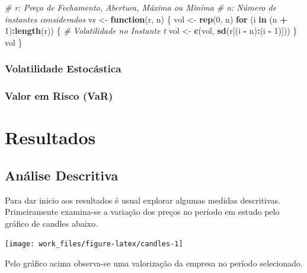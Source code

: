 \documentclass[]{article}
\newenvironment{Shaded}{\begin{snugshade}}{\end{snugshade}}
\newcommand{\KeywordTok}[1]{\textcolor[rgb]{0.13,0.29,0.53}{\textbf{#1}}}
\newcommand{\DecValTok}[1]{\textcolor[rgb]{0.00,0.00,0.81}{#1}}
\newcommand{\StringTok}[1]{\textcolor[rgb]{0.31,0.60,0.02}{#1}}
\newcommand{\CommentTok}[1]{\textcolor[rgb]{0.56,0.35,0.01}{\textit{#1}}}
\newcommand{\ControlFlowTok}[1]{\textcolor[rgb]{0.13,0.29,0.53}{\textbf{#1}}}
\newcommand{\OperatorTok}[1]{\textcolor[rgb]{0.81,0.36,0.00}{\textbf{#1}}}
\newcommand{\NormalTok}[1]{#1}
\begin{document}
\begin{Shaded}
\begin{Highlighting}[]
\CommentTok{# r: Preço de Fechamento, Abertura, Máxima ou Miníma}
\CommentTok{# n: Número de instantes considerados}
\NormalTok{vs <-}\StringTok{ }\ControlFlowTok{function}\NormalTok{(r, n) \{}
\NormalTok{    vol <-}\StringTok{ }\KeywordTok{rep}\NormalTok{(}\DecValTok{0}\NormalTok{, n)}
    \ControlFlowTok{for}\NormalTok{ (i }\ControlFlowTok{in}\NormalTok{ (n }\OperatorTok{+}\StringTok{ }\DecValTok{1}\NormalTok{)}\OperatorTok{:}\KeywordTok{length}\NormalTok{(r)) \{}
        \CommentTok{# Volatilidade no Instante t}
\NormalTok{        vol <-}\StringTok{ }\KeywordTok{c}\NormalTok{(vol, }\KeywordTok{sd}\NormalTok{(r[(i }\OperatorTok{-}\StringTok{ }\NormalTok{n)}\OperatorTok{:}\NormalTok{(i }\OperatorTok{-}\StringTok{ }\DecValTok{1}\NormalTok{)]))}
\NormalTok{    \}}
\NormalTok{    vol}
\NormalTok{\}}
\end{Highlighting}
\end{Shaded}

\subsubsection{Volatilidade Estocástica}\label{volatilidade-estocastica}

\subsubsection{Valor em Risco (VaR)}\label{valor-em-risco-var}

\section{Resultados}\label{resultados}

\subsection{Análise Descritiva}\label{analise-descritiva}

Para dar inicio aos resultados é usual explorar algumas medidas
descritivas. Primeiramente examina-se a variação dos preços no período
em estudo pelo gráfico de candles abaixo.

\begin{center}\texttt{[image: work\_files/figure-latex/candles-1]} \end{center}

Pelo gráfico acima observa-se uma valorização da empresa no período
selecionado.
\end{document}
